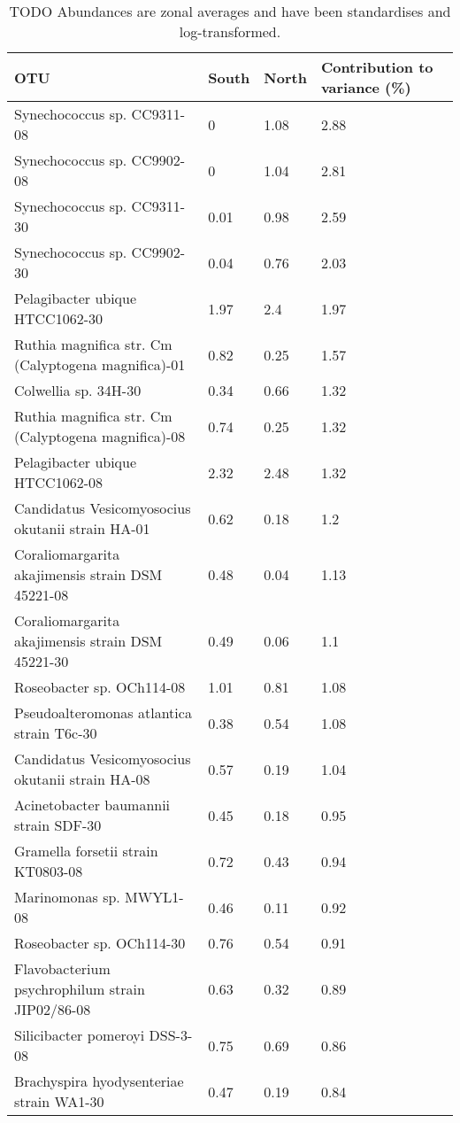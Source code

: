 \begin{table}
\begin{center}
\caption[TODO]{TODO Abundances are zonal averages and have been standardises and log-transformed.}
\label{tab:otussimper}
\begin{tabularx}{\textwidth}{Xlll}
\toprule
OTU & South & North & Contribution to variance (\%)\\

\midrule
Synechococcus sp. CC9311-08 & 0 & 1.08 & 2.88\\
Synechococcus sp. CC9902-08 & 0 & 1.04 & 2.81\\
Synechococcus sp. CC9311-30 & 0.01 & 0.98 & 2.59\\
Synechococcus sp. CC9902-30 & 0.04 & 0.76 & 2.03\\
Pelagibacter ubique HTCC1062-30 & 1.97 & 2.4 & 1.97\\
Ruthia magnifica str. Cm (Calyptogena magnifica)-01 & 0.82 & 0.25 & 1.57\\
Colwellia sp. 34H-30 & 0.34 & 0.66 & 1.32\\
Ruthia magnifica str. Cm (Calyptogena magnifica)-08 & 0.74 & 0.25 & 1.32\\
Pelagibacter ubique HTCC1062-08 & 2.32 & 2.48 & 1.32\\
Candidatus Vesicomyosocius okutanii strain HA-01 & 0.62 & 0.18 & 1.2\\
Coraliomargarita akajimensis strain DSM 45221-08 & 0.48 & 0.04 & 1.13\\
Coraliomargarita akajimensis strain DSM 45221-30 & 0.49 & 0.06 & 1.1\\
Roseobacter sp. OCh114-08 & 1.01 & 0.81 & 1.08\\
Pseudoalteromonas atlantica strain T6c-30 & 0.38 & 0.54 & 1.08\\
Candidatus Vesicomyosocius okutanii strain HA-08 & 0.57 & 0.19 & 1.04\\
Acinetobacter baumannii strain SDF-30 & 0.45 & 0.18 & 0.95\\
Gramella forsetii strain KT0803-08 & 0.72 & 0.43 & 0.94\\
Marinomonas sp. MWYL1-08 & 0.46 & 0.11 & 0.92\\
Roseobacter sp. OCh114-30 & 0.76 & 0.54 & 0.91\\
Flavobacterium psychrophilum strain JIP02/86-08 & 0.63 & 0.32 & 0.89\\
Silicibacter pomeroyi DSS-3-08 & 0.75 & 0.69 & 0.86\\
Brachyspira hyodysenteriae strain WA1-30 & 0.47 & 0.19 & 0.84\\

\end{tabularx}
\end{center}
\end{table}
